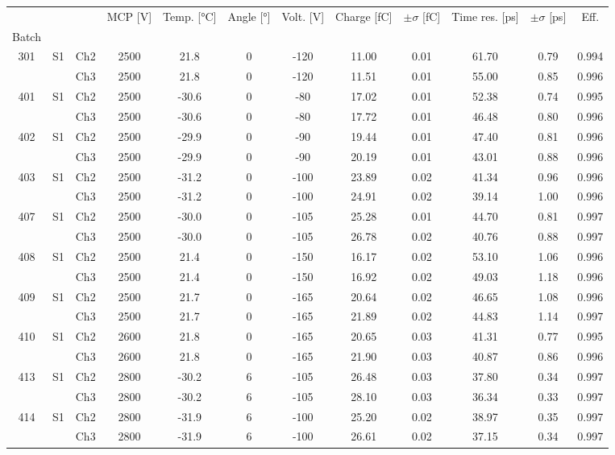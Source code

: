 \begin{tabular}{cccccccccccc}
\toprule
 &  &  & MCP [V] & Temp. [°C] & Angle [°] & Volt. [V] & Charge [fC] & \(\pm\sigma\) [fC] & Time res. [ps] & \(\pm\sigma\) [ps] & Eff. \\
Batch &  &  &  &  &  &  &  &  &  &  &  \\
\midrule
301 & S1 & Ch2 & 2500 & 21.8 & 0 & -120 & 11.00 & 0.01 & 61.70 & 0.79 & 0.994 \\
 &  & Ch3 & 2500 & 21.8 & 0 & -120 & 11.51 & 0.01 & 55.00 & 0.85 & 0.996 \\
401 & S1 & Ch2 & 2500 & -30.6 & 0 & -80 & 17.02 & 0.01 & 52.38 & 0.74 & 0.995 \\
 &  & Ch3 & 2500 & -30.6 & 0 & -80 & 17.72 & 0.01 & 46.48 & 0.80 & 0.996 \\
402 & S1 & Ch2 & 2500 & -29.9 & 0 & -90 & 19.44 & 0.01 & 47.40 & 0.81 & 0.996 \\
 &  & Ch3 & 2500 & -29.9 & 0 & -90 & 20.19 & 0.01 & 43.01 & 0.88 & 0.996 \\
403 & S1 & Ch2 & 2500 & -31.2 & 0 & -100 & 23.89 & 0.02 & 41.34 & 0.96 & 0.996 \\
 &  & Ch3 & 2500 & -31.2 & 0 & -100 & 24.91 & 0.02 & 39.14 & 1.00 & 0.996 \\
407 & S1 & Ch2 & 2500 & -30.0 & 0 & -105 & 25.28 & 0.01 & 44.70 & 0.81 & 0.997 \\
 &  & Ch3 & 2500 & -30.0 & 0 & -105 & 26.78 & 0.02 & 40.76 & 0.88 & 0.997 \\
408 & S1 & Ch2 & 2500 & 21.4 & 0 & -150 & 16.17 & 0.02 & 53.10 & 1.06 & 0.996 \\
 &  & Ch3 & 2500 & 21.4 & 0 & -150 & 16.92 & 0.02 & 49.03 & 1.18 & 0.996 \\
409 & S1 & Ch2 & 2500 & 21.7 & 0 & -165 & 20.64 & 0.02 & 46.65 & 1.08 & 0.996 \\
 &  & Ch3 & 2500 & 21.7 & 0 & -165 & 21.89 & 0.02 & 44.83 & 1.14 & 0.997 \\
410 & S1 & Ch2 & 2600 & 21.8 & 0 & -165 & 20.65 & 0.03 & 41.31 & 0.77 & 0.995 \\
 &  & Ch3 & 2600 & 21.8 & 0 & -165 & 21.90 & 0.03 & 40.87 & 0.86 & 0.996 \\
413 & S1 & Ch2 & 2800 & -30.2 & 6 & -105 & 26.48 & 0.03 & 37.80 & 0.34 & 0.997 \\
 &  & Ch3 & 2800 & -30.2 & 6 & -105 & 28.10 & 0.03 & 36.34 & 0.33 & 0.997 \\
414 & S1 & Ch2 & 2800 & -31.9 & 6 & -100 & 25.20 & 0.02 & 38.97 & 0.35 & 0.997 \\
 &  & Ch3 & 2800 & -31.9 & 6 & -100 & 26.61 & 0.02 & 37.15 & 0.34 & 0.997 \\
\bottomrule
\end{tabular}
